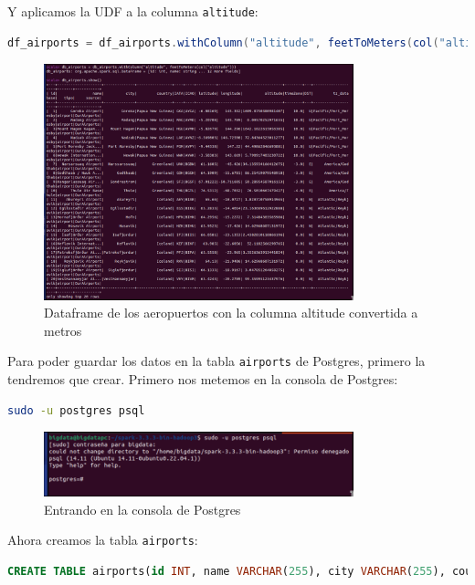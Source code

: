 Y aplicamos la UDF a la columna \texttt{altitude}:

\begin{lstlisting}[language=scala]
df_airports = df_airports.withColumn("altitude", feetToMeters(col("altitude")))
\end{lstlisting}

\begin{figure}[H]
    \centering
    \includegraphics[width=0.8\textwidth]{figures/45.png}
    \caption{Dataframe de los aeropuertos con la columna altitude convertida a metros}
    \label{fig:airports_df_altitude}
\end{figure}

Para poder guardar los datos en la tabla \texttt{airports} de Postgres, primero la tendremos que crear. Primero nos metemos en la consola de Postgres:

\begin{lstlisting}[language=bash]
sudo -u postgres psql
\end{lstlisting}

\begin{figure}[H]
    \centering
    \includegraphics[width=0.8\textwidth]{figures/46.png}
    \caption{Entrando en la consola de Postgres}
    \label{fig:enter_postgres_console}
\end{figure}

Ahora creamos la tabla \texttt{airports}:

\begin{lstlisting}[language=sql]
CREATE TABLE airports(id INT, name VARCHAR(255), city VARCHAR(255), country VARCHAR(255), IATA VARCHAR(255), ICAO VARCHAR(255), latitude FLOAT, longitude FLOAT, altitude DOUBLE PRECISION, timeZone INT, DST VARCHAR(255), tz_database VARCHAR(255), tipo VARCHAR(255), source VARCHAR(255));
\end{lstlisting}

